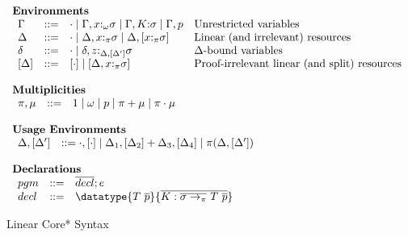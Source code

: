 \begin{figure}[h]
\begin{framed}
\[\begin{array}{l}
\begin{array}{lcll}
\end{array}\\\\
%
\textbf{Environments}\\
\begin{array}{lcll}
  \Gamma   & ::=  & \cdot \mid \Gamma,x{:}_\omega\sigma \mid \Gamma,K{:}\sigma \mid \Gamma,p & \textrm{Unrestricted variables} \\
    \Delta   & ::=  & \cdot \mid \Delta,x{:}_\pi\sigma \mid \Delta,[x{:}_\pi\sigma] & \textrm{Linear (and irrelevant) resources} \\
  \delta   & ::=  & \cdot \mid \delta,z{:}_{\Delta,[\Delta']}\sigma & \textrm{$\Delta$-bound variables}\\
  \left[\Delta\right] & ::=  & \left[\cdot\right] \mid \left[\Delta,x{:}_\pi\sigma\right] & \textrm{Proof-irrelevant linear (and split) resources} \\
\end{array}\\\\
%
\textbf{Multiplicities}\\
\begin{array}{lcll}
  \pi, \mu & ::= & 1 \mid \omega \mid p \mid \pi + \mu \mid \pi \cdot \mu\\
\end{array}\\\\
%
\textbf{Usage Environments}\\
\begin{array}{lcl}
  \Delta,\left[\Delta'\right] & ::= \cdot,\left[\cdot\right]\mid\Delta_1,\left[\Delta_2\right]+\Delta_3,\left[\Delta_4\right] \mid \pi(\Delta,\left[\Delta'\right])\\
\end{array}\\\\
%
\textbf{Declarations}\\
\begin{array}{lcl}
  pgm & ::= & \overline{decl}; e \\
  decl & ::= & \datatype{T~\overline{p}}{\overline{K:\overline{\sigma \to_\pi}~T~\overline{p}}}
\end{array}
%
\end{array}
\]
\end{framed}
\caption{Linear Core* Syntax}
\label{linear-core-syntax}
\end{figure}

